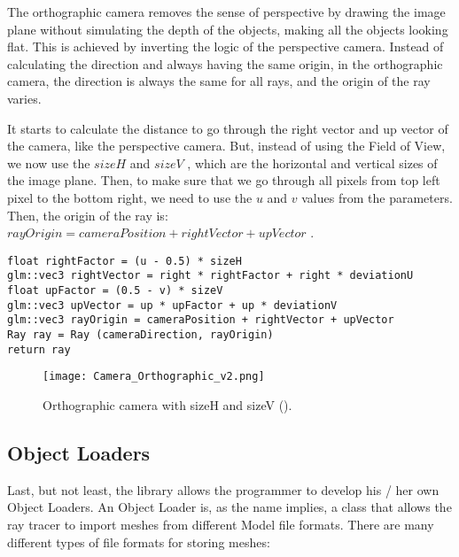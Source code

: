 \par
The orthographic camera removes the sense of perspective by drawing the image plane without simulating the depth of the objects, making all the objects looking flat.
This is achieved by inverting the logic of the perspective camera.
Instead of calculating the direction and always having the same origin, in the orthographic camera, the direction is always the same for all rays, and the origin of the ray varies.

\par
It starts to calculate the distance to go through the right vector and up vector of the camera, like the perspective camera.
But, instead of using the Field of View, we now use the
$sizeH$
and
$sizeV$
, which are the horizontal and vertical sizes of the image plane.
Then, to make sure that we go through all pixels from top left pixel to the bottom right, we need to use the
$u$
and
$v$
values from the parameters.
Then, the origin of the ray is:
$rayOrigin = cameraPosition + rightVector + upVector$
.

\begin{lstlisting}[caption={Algorithm of generateRay in Orthographic Camera}, captionpos=b, label=Orthographic]
float rightFactor = (u - 0.5) * sizeH
glm::vec3 rightVector = right * rightFactor + right * deviationU
float upFactor = (0.5 - v) * sizeV
glm::vec3 upVector = up * upFactor + up * deviationV
glm::vec3 rayOrigin = cameraPosition + rightVector + upVector
Ray ray = Ray (cameraDirection, rayOrigin)
return ray
\end{lstlisting}

\begin{figure}[H]
	\centering
	\caption{Orthographic camera with sizeH and sizeV (\cite{Camera_Perspective_Orthographic}).}
	\label{Perspective_Camera.}
	\texttt{[image: Camera\_Orthographic\_v2.png]}
\end{figure}


\subsection{Object Loaders}

\par
Last, but not least, the library allows the programmer to develop his / her own Object Loaders.
An Object Loader is, as the name implies, a class that allows the ray tracer to import meshes from different Model file formats.
There are many different types of file formats for storing meshes:


